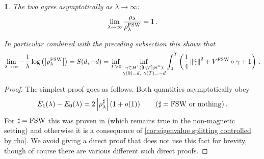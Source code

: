 \documentclass[a4paper,10pt]{article}
\numberwithin{equation}{section}
\theoremstyle{plain}
\theoremstyle{plain}
\theoremstyle{plain}
\theoremstyle{plain}
\newtheorem{prop}[thm]{\protect\propositionname}
\theoremstyle{plain}
\theoremstyle{remark}
\theoremstyle{definition}
\providecommand{\propositionname}{Proposition}
\newcommand{\RR}{\mathbb{R}}
\newcommand\norm[1]{\left\lVert#1\right\rVert}
\newcommand{\dif}{\operatorname{d}\!} %
\newcommand{\vf}{\varphi}
\newcommand{\Id}{\mathds{1}}
\newcommand{\abs}[1]{\left\lvert#1\right\rvert}
\newcommand{\eq}[1]{\begin{align*}#1\end{align*}}
\newcommand{\eql}[1]{\begin{align}#1\end{align}}
\newcommand{\br}[1]{\left(#1\right)}
\begin{document}
\begin{prop}
    The two agree asymptotically as $\lambda\to\infty$:
    \eql{
        \lim_{\lambda\to\infty} \frac{\rho_\lambda}{\rho_\lambda^{\rm FSW}} = 1\,.
    }

    In particular combined with the preceding subsection this shows that 
    \eq{
        \lim_{\lambda\to\infty}-\frac{1}{\lambda}\log\br{\abs{\rho_\lambda^{\rm FSW}}} = S(d,-d) = \inf_{T>0} \inf_{\substack{
\gamma\in H^1([0,T];\RR^n)\\
\gamma(0)=d,\ \gamma(T)=-d
}}
\int_0^T
\left(
\frac14\norm{\dot\gamma}^2+V^{\rm FSW}\circ\gamma
+1\right)\,.
    }
\end{prop}
\begin{proof}
The simplest proof goes as follows. Both quantities asymptotically obey 
\eq{
E_1(\lambda)-E_0(\lambda) = 2\abs{\rho_\lambda^\sharp}\br{1+o(1)}\qquad(\sharp = {\rm FSW }\text{ or nothing})\,.
} For $\sharp=\rm FSW$ this was proven in \cite{FeffermanShapiroWeinstein2022} (which remains true in the non-magnetic setting) and otherwise it is a consequence of \cref{cor:eigenvalue splitting controlled by rho}. We avoid giving a direct proof that does not use this fact for brevity, though of course there are various different such direct proofs.




\end{proof}
\end{document}
